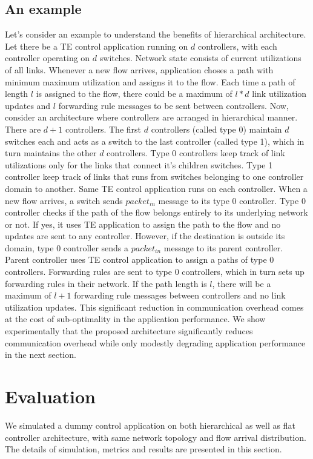\documentclass[10pt, twocolumn]{article}
\begin{document}
\subsection{An example}
\label{example}
Let's consider an example to understand the benefits of hierarchical architecture. Let there be a TE control application running on $d$ controllers, with each controller operating on $d$ switches. Network state consists of current utilizations of all links. Whenever a new flow arrives, application choses a path with minimum maximum utilization and assigns it to the flow. Each time a path of length $l$ is assigned to the flow, there could be a maximum of $l*d$ link utilization updates and $l$ forwarding rule messages to be sent between controllers. Now, consider an architecture where controllers are arranged in hierarchical manner. There are $d+1$ controllers. The first $d$ controllers (called type 0) maintain $d$ switches each and acts as a switch to the last controller (called type 1), which in turn maintains the other $d$ controllers. Type 0 controllers keep track of link utilizations only for the links that connect it's children switches. Type 1 controller keep track of links that runs from switches belonging to one controller domain to another. Same TE control application runs on each controller. When a new flow arrives, a switch sends $packet_{in}$ message to its type 0 controller. Type 0 controller checks if the path of the flow belongs entirely to its underlying network or not. If yes, it uses TE application to assign the path to the flow and no updates are sent to any controller. However, if the destination is outside its domain, type 0 controller sends a $packet_{in}$ message to its parent controller. Parent controller uses TE control application to assign a paths of type 0 controllers. Forwarding rules are sent to type 0 controllers, which in turn sets up forwarding rules in their network. If the path length is $l$, there will be a maximum of $l+1$ forwarding rule messages between controllers and no link utilization updates. This significant reduction in communication overhead comes at the cost of sub-optimality in the application performance. We show experimentally that the proposed architecture significantly reduces communication overhead while only modestly degrading application performance in the next section.

\section{Evaluation}
\label{sec:eval}
We simulated a dummy control application on both hierarchical as well as flat controller architecture, with same network topology and flow arrival distribution. The details of simulation, metrics and results are presented in this section.
\end{document}
